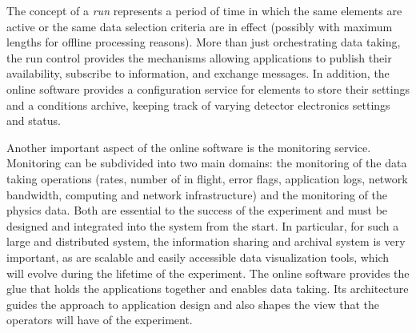 The concept of a \textit{run} represents a period of time in which the same
 elements are active or the same data selection criteria
are in effect (possibly with maximum lengths for offline processing
reasons). 
More than just orchestrating data taking, the run control
provides the mechanisms allowing  applications to publish
their availability, subscribe to information, and exchange messages. 
In addition, the online software provides a configuration service
for  elements to store their settings and a conditions
archive, keeping track of varying detector electronics settings and
status.

Another important aspect of the online software is the monitoring
service.
Monitoring can be subdivided into two main domains: the monitoring of
the data taking operations (rates, number of 
in flight, error flags, application logs, network bandwidth, %
computing and network infrastructure) and the monitoring of the
physics data.
Both are essential to the success of the experiment and must be %
designed and integrated into the  system from the start.
In particular, for such a large and distributed system, the information sharing and archival system is very important, as are 
scalable and easily accessible data visualization tools, which will evolve during the lifetime of the experiment.
The online software provides the glue that holds the
 applications together and enables %
data taking.
Its architecture guides the
approach to  application design and also shapes the view
that the operators will have of the experiment.

